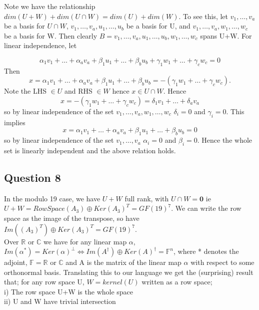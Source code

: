 \documentclass[10pt,a4paper]{report}
\begin{document}
\vspace{1cm}	

Note we have the relationship $dim(U+W)+dim(U \cap W)=dim(U)+dim(W)$. To see this, let ${v_1, \ldots , v_a}$ be a basis for $U \cap W$, ${v_1, \ldots ,v_a,u_1, \ldots ,u_b}$ be a basis for U, and ${v_1, \ldots ,v_a,w_1, \ldots, w_c}$ be a basis for W. Then clearly $B= {v_1, \ldots,v_a, u_1, \ldots, u_b, w_1, \ldots, w_c}$ spans U+W. For linear independence, let 

\begin{equation*}
\alpha_1v_1 + \ldots + \alpha_av_a + \beta_1u_1 + \ldots + \beta_bu_b + \gamma_1w_1 + \ldots + \gamma_cw_c = 0
\end{equation*}
Then
\begin{equation*}
x=\alpha_1v_1 + \ldots + \alpha_av_a + \beta_1u_1 + \ldots + \beta_bu_b = -(\gamma_1w_1 + \ldots + \gamma_cw_c). 
\end{equation*}
Note the LHS $\in U$ and RHS $\in W$ hence $x \in U \cap W$. Hence 
\begin{equation*}
x=-(\gamma_1w_1 + \ldots + \gamma_cw_c)=\delta_1v_1 + \ldots + \delta_av_a
\end{equation*}
so by linear independence of the set ${v_1, \ldots ,v_a,w_1, \ldots, w_c}$ $\delta_i=0$ and $\gamma_i=0$. This implies 
\begin{equation*}
x=\alpha_1v_1 + \ldots + \alpha_av_a + \beta_1u_1 + \ldots + \beta_bu_b=0
\end{equation*}
so by linear independence of the set ${v_1, \ldots , v_a}$ $\alpha_i=0$ and $\beta_i=0$. Hence the whole set is linearly independent and the above relation holds.

\subsection*{Question 8}
In the modulo 19 case, we have $U+W$ full rank, with $U \cap W = \bm{0}$ ie $U+W=RowSpace(A_3) \oplus Ker(A_3)^T =GF(19)^7$. We can write the row space as the image of the transpose, so have $Im((A_3)^T) \oplus Ker(A_3)^T =GF(19)^7$. \\

Over $\mathbb{R}$ or $\mathbb{C}$ we have for any linear map $\alpha$, $Im(\alpha^*)=	Ker(\alpha)^\perp \Leftrightarrow Im(A^\dagger) \oplus Ker(A)^\dagger = \mathbb{F}^n$, where * denotes the adjoint, $\mathbb{F}=\mathbb{R}$ or $\mathbb{C}$  and A is the matrix of the linear map $\alpha$ with respect to some orthonormal basis. Translating this to our language we get the (surprising) result that; for any row space U, $W=kernel(U)$ written as a row space;\\
i) The row space U+W is the whole space\\
ii) U and W have trivial intersection\\
\end{document}
